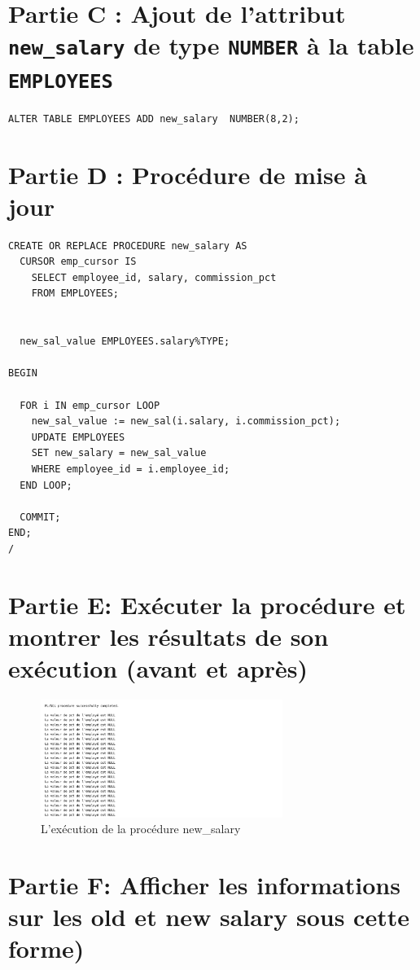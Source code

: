 \documentclass[12pt,a4paper]{article}
\begin{document}
\section{Partie C : Ajout de l’attribut \texttt{new\_salary} de type \texttt{NUMBER} à la table \texttt{EMPLOYEES}}

\begin{lstlisting}[style=plsql]
  ALTER TABLE EMPLOYEES ADD new_salary  NUMBER(8,2);
\end{lstlisting}

\section{Partie D : Procédure de mise à jour}
\begin{lstlisting}[style=plsql]
  CREATE OR REPLACE PROCEDURE new_salary AS 
  CURSOR emp_cursor IS
    SELECT employee_id, salary, commission_pct
    FROM EMPLOYEES;
    

  new_sal_value EMPLOYEES.salary%TYPE;

BEGIN
  
  FOR i IN emp_cursor LOOP
    new_sal_value := new_sal(i.salary, i.commission_pct);
    UPDATE EMPLOYEES
    SET new_salary = new_sal_value
    WHERE employee_id = i.employee_id;
  END LOOP;

  COMMIT; 
END;
/\end{lstlisting}
\section{Partie E: Exécuter la procédure et montrer les résultats de son exécution (avant et après)}
\begin{figure}[h!]
  \centering
  \includegraphics[width=0.7\textwidth]{01.png}
  \caption{L'exécution de la procédure new_salary}
  \label{fig:mon_image}
\end{figure}
\newpage
\section{Partie F: Afficher les informations sur les old et new salary sous cette forme)}
\end{document}
